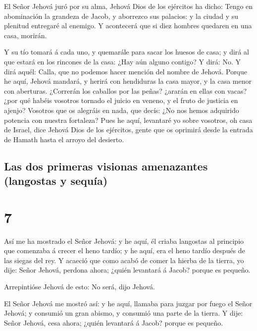 El Señor Jehová juró por su alma, Jehová Dios de los
ejércitos ha dicho: Tengo en abominación la grandeza de Jacob, y
aborrezco sus palacios: y la ciudad y su plenitud entregaré al enemigo.
 Y acontecerá que si diez hombres quedaren en una casa,
morirán.

 Y su tío tomará á cada uno, y quemarále para sacar los
huesos de casa; y dirá al que estará en los rincones de la casa: ¿Hay
aún alguno contigo? Y dirá: No. Y dirá aquél: Calla, que no podemos
hacer mención del nombre de Jehová.  Porque he aquí,
Jehová mandará, y herirá con hendiduras la casa mayor, y la casa menor
con aberturas.  ¿Correrán los caballos por las peñas?
¿ararán en ellas con vacas? ¿por qué habéis vosotros tornado el juicio
en veneno, y el fruto de justicia en ajenjo?  Vosotros
que os alegráis en nada, que decís: ¿No nos hemos adquirido potencia con
nuestra fortaleza?  Pues he aquí, levantaré yo sobre
vosotros, oh casa de Israel, dice Jehová Dios de los ejércitos, gente
que os oprimirá desde la entrada de Hamath hasta el arroyo del desierto.

\hypertarget{las-dos-primeras-visionas-amenazantes-langostas-y-sequuxeda}{%
\subsection{Las dos primeras visionas amenazantes (langostas y
sequía)}\label{las-dos-primeras-visionas-amenazantes-langostas-y-sequuxeda}}

\hypertarget{section-30-7}{%
\section{7}\label{section-30-7}}

 Así me ha mostrado el Señor Jehová: y he aquí, él criaba
langostas al principio que comenzaba á crecer el heno tardío; y he aquí,
era el heno tardío después de las siegas del rey.  Y
acaeció que como acabó de comer la hierba de la tierra, yo dije: Señor
Jehová, perdona ahora; ¿quién levantará á Jacob? porque es pequeño.

 Arrepintióse Jehová de esto: No será, dijo Jehová.

 El Señor Jehová me mostró así: y he aquí, llamaba para
juzgar por fuego el Señor Jehová; y consumió un gran abismo, y consumió
una parte de la tierra.  Y dije: Señor Jehová, cesa ahora;
¿quién levantará á Jacob? porque es pequeño.

